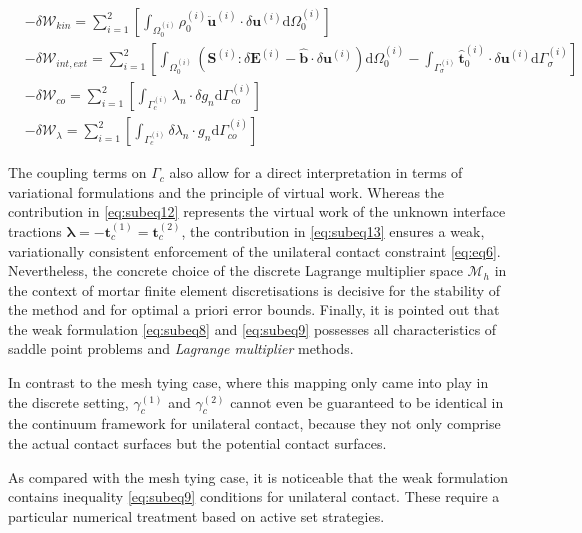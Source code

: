 \documentclass[a4paper,10pt]{article} %
\begin{document}
\begin{subequations}\label{eq:constributions}
 \begin{align}
  & -\delta \mathcal{W}_{kin} = \sum_{i = 1}^2 \left[\int_{\Omega_0^{(i)}} \rho_0^{(i)} \ddot{\mathbf{u}}^{(i)} \cdot \delta \mathbf{u}^{(i)} \text{d}\Omega_{0}^{(i)}\right] \label{eq:subeq10} \\
 & -\delta \mathcal{W}_{int,ext} = \sum_{i = 1}^2 \left[\int_{\Omega_0^{(i)}} \left(\mathbf{S}^{(i)} : \delta \mathbf{E}^{(i)} - \hat{\mathbf{b}}\cdot \delta\mathbf{u}^{(i)} \right) \text{d}\Omega_{0}^{(i)} - \int_{\Gamma_\sigma^{(i)}} \hat{\mathbf{t}}_0^{(i)}\cdot\delta\mathbf{u}^{(i)} \text{d}\Gamma_{\sigma}^{(i)} \right] \label{eq:subeq11} \\
 & -\delta \mathcal{W}_{co} = \sum_{i = 1}^2 \left[\int_{\Gamma_c^{(i)}} \lambda_n \cdot \delta g_n \text{d}\Gamma_{co}^{(i)}\right] \label{eq:subeq12} \\
 & -\delta \mathcal{W}_{\lambda} = \sum_{i = 1}^2 \left[\int_{\Gamma_c^{(i)}} \delta \lambda_n \cdot g_n \text{d}\Gamma_{co}^{(i)}\right] \label{eq:subeq13}
 \end{align}
\end{subequations}

The coupling terms on $\Gamma_c$ also allow for a direct interpretation in terms of variational formulations and the principle of virtual work. Whereas the contribution in \eqref{eq:subeq12} represents the virtual work of the unknown interface tractions $\boldsymbol{\lambda} = −\mathbf{t}_c^{(1)} = \mathbf{t}_c^{(2)}$, the contribution in \eqref{eq:subeq13} ensures a weak, variationally consistent enforcement of the unilateral contact constraint \eqref{eq:eq6}. Nevertheless, the concrete choice of the discrete Lagrange multiplier space $\mathcal{M}_h$ in the context of mortar finite element discretisations is decisive for the stability of the method and for optimal a priori error bounds. Finally, it is pointed out that the weak formulation \eqref{eq:subeq8} and \eqref{eq:subeq9} possesses all characteristics of saddle point problems and \textit{Lagrange multiplier} methods.

In contrast to the mesh tying case, where this mapping only came into play in the discrete setting, $\gamma_c^{(1)}$ and $\gamma_c^{(2)}$ cannot even be guaranteed to be identical in the continuum framework for unilateral contact, because they not only comprise the actual contact surfaces but the potential contact surfaces.

As compared with the mesh tying case, it is noticeable that the weak formulation contains inequality \eqref{eq:subeq9} conditions for unilateral contact. These require a particular numerical treatment based on active set strategies.
\end{document}
